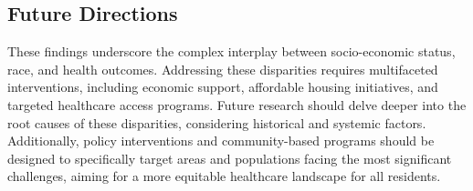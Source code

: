 \documentclass[12pt]{article}
\begin{document}
\subsection{Future Directions}
These findings underscore the complex interplay between socio-economic status, race, and health outcomes. 
Addressing these disparities requires multifaceted interventions, including economic support, affordable 
housing initiatives, and targeted healthcare access programs. Future research should delve deeper into the 
root causes of these disparities, considering historical and systemic factors. Additionally, policy interventions 
and community-based programs should be designed to specifically target areas and populations facing the most 
significant challenges, aiming for a more equitable healthcare landscape for all residents.


\appendix



\end{document}
